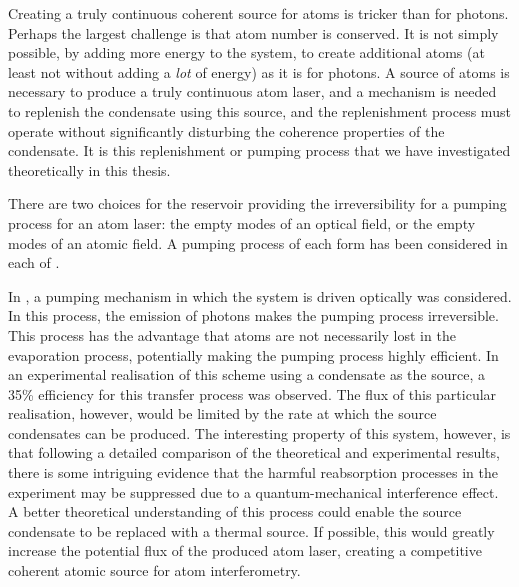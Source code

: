 Creating a truly continuous coherent source for atoms is tricker than for photons.  Perhaps the largest challenge is that atom number is conserved.  It is not simply possible, by adding more energy to the system, to create additional atoms (at least not without adding a \emph{lot} of energy) as it is for photons.  A source of atoms is necessary to produce a truly continuous atom laser, and a mechanism is needed to replenish the condensate using this source, and the replenishment process must operate without significantly disturbing the coherence properties of the condensate.  It is this replenishment or pumping process that we have investigated theoretically in this thesis.

There are two choices for the reservoir providing the irreversibility for a pumping process for an atom laser: the empty modes of an optical field, or the empty modes of an atomic field.  A pumping process of each form has been considered in each of .

In , a pumping mechanism in which the system is driven optically was considered.  In this process, the emission of photons makes the pumping process irreversible.  This process has the advantage that atoms are not necessarily lost in the evaporation process, potentially making the pumping process highly efficient.  In an experimental realisation of this scheme using a condensate as the source, a 35\% efficiency for this transfer process was observed.  The flux of this particular realisation, however, would be limited by the rate at which the source condensates can be produced.  The interesting property of this system, however, is that following a detailed comparison of the theoretical and experimental results, there is some intriguing evidence that the harmful reabsorption processes in the experiment may be suppressed due to a quantum-mechanical interference effect.  A better theoretical understanding of this process could enable the source condensate to be replaced with a thermal source.  If possible, this would greatly increase the potential flux of the produced atom laser, creating a competitive coherent atomic source for atom interferometry.

